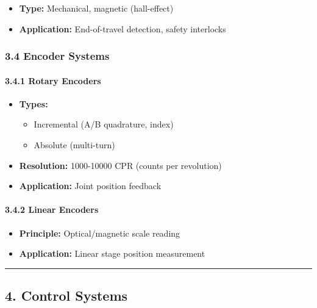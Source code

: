 \documentclass[
]{article}
\providecommand{\tightlist}{%
  \setlength{\itemsep}{0pt}\setlength{\parskip}{0pt}}
\begin{document}
\begin{itemize}
\tightlist
\item
  \textbf{Type:} Mechanical, magnetic (hall-effect)
\item
  \textbf{Application:} End-of-travel detection, safety interlocks
\end{itemize}

\hypertarget{encoder-systems}{%
\subsubsection{3.4 Encoder Systems}\label{encoder-systems}}

\hypertarget{rotary-encoders}{%
\paragraph{3.4.1 Rotary Encoders}\label{rotary-encoders}}

\begin{itemize}
\tightlist
\item
  \textbf{Types:}

  \begin{itemize}
  \tightlist
  \item
    Incremental (A/B quadrature, index)
  \item
    Absolute (multi-turn)
  \end{itemize}
\item
  \textbf{Resolution:} 1000-10000 CPR (counts per revolution)
\item
  \textbf{Application:} Joint position feedback
\end{itemize}

\hypertarget{linear-encoders}{%
\paragraph{3.4.2 Linear Encoders}\label{linear-encoders}}

\begin{itemize}
\tightlist
\item
  \textbf{Principle:} Optical/magnetic scale reading
\item
  \textbf{Application:} Linear stage position measurement
\end{itemize}

\begin{center}\rule{0.5\linewidth}{0.5pt}\end{center}

\hypertarget{control-systems}{%
\subsection{4. Control Systems}\label{control-systems}}
\end{document}
